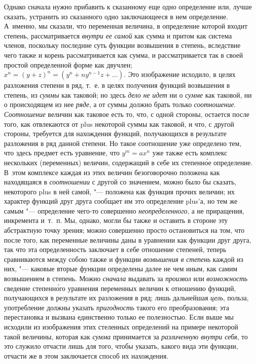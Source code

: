 Однако сначала нужно прибавить к сказанному еще одно определение или, лучше
сказать, устранить из сказанного одно заключающееся в нем определение.
А~именно, мы сказали, что переменная величина, в определение которой входит
степень, рассматривается {\em внутри ее самой} как
сумма и притом как система членов, поскольку последние суть функции
возвышения в степень, вследствие чего также и корень рассматривается как
сумма, и рассматривается так в своей простой определенной форме как
двучлен; $x^n = (y + z)^n = (y^n + ny^{n-1}z + \dots)$. Это изображение
исходило, в целях разложения степени в ряд, т.~е. в целях получения функций
возвышения в степень, из {\em суммы} как таковой; но
здесь {\em дело не идет} ни о {\em сумме} как таковой, ни о происходящем из
нее {\em ряде}, а от суммы должно брать только {\em соотношение}.
{\em Соотношение} величин как таковое есть то, что, с
одной стороны, остается после того, как отвлекаются от plus некоторой суммы
как таковой, и что, с другой стороны, требуется для нахождения функций,
получающихся в результате разложения в ряд данной степени. Но такое
соотношение уже определено тем, что здесь предмет есть уравнение, что
$y^m = ax^n$ уже также есть комплекс нескольких (переменных) величин,
содержащий в себе их степенн\'{о}е определение. В~этом комплексе каждая из этих
величин безоговорочно положена как находящаяся в
{\em соотношении} с другой со значением, можно было бы
сказать, некоторого plus в ней самой, "--- положена как функция прочих
величин; их характер функций друг друга сообщает им это определение plus'а,
но тем же самым "--- определение чего-то совершенно
{\em неопределенного}, а не приращения, инкремента
и~т.~п. Мы, однако, могли бы также и оставить в стороне эту абстрактную
точку зрения; можно совершенно просто остановиться на том, что после того,
как переменные величины даны в уравнении как функции друг друга, так что
эта определенность заключает в себе отношение степеней, теперь сравниваются
между собою также и функции {\em возвышения в степень}
каждой из них, "--- каковые вторые функции определены далее не чем иным, как
самим возвышением в степень. Можно {\em сначала}
выдавать за {\em произвол} или
{\em возможность} сведение степенн\'{о}го уравнения
переменных величин к отношению функций, получающихся в результате их
разложения в ряд; лишь дальнейшая {\em цель}, польза,
употребление должны указать {\em пригодность} такого
его преобразования; эта перестановка и вызвана единственно только ее
полезностью. Если выше мы исходили из изображения этих стеленных
определений на примере некоторой такой величины, которая как
{\em сумма} принимается за
{\em различенную внутри себя}, то это служило отчасти
лишь для того, чтобы указать, какого вида эти функции, отчасти же в этом
заключается способ их нахождения.

